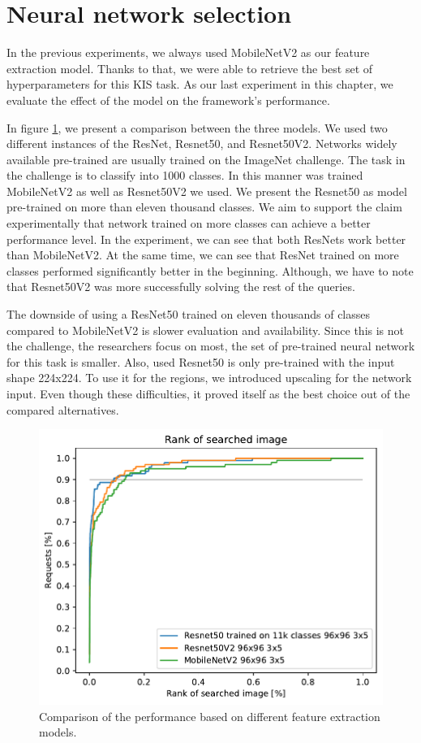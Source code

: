 \section{Neural network selection}

In the previous experiments, we always used MobileNetV2 as our feature extraction model. Thanks to that, we were able to retrieve the best set of hyperparameters for this KIS task. As our last experiment in this chapter, we evaluate the effect of the model on the framework's performance.

In figure \ref{fig:networks}, we present a comparison between the three models. We used two different instances of the ResNet, Resnet50, and Resnet50V2. Networks widely available pre-trained are usually trained on the ImageNet challenge. The task in the challenge is to classify into 1000 classes. In this manner was trained MobileNetV2 as well as Resnet50V2 we used. We present the Resnet50 as model pre-trained on more than eleven thousand classes. We aim to support the claim experimentally that network trained on more classes can achieve a better performance level. In the experiment, we can see that both ResNets work better than MobileNetV2. At the same time, we can see that ResNet trained on more classes performed significantly better in the beginning. Although, we have to note that Resnet50V2 was more successfully solving the rest of the queries.

The downside of using a ResNet50 trained on eleven thousands of classes compared to MobileNetV2 is slower evaluation and availability. Since this is not the challenge, the researchers focus on most, the set of pre-trained neural network for this task is smaller. Also, used Resnet50 is only pre-trained with the input shape 224x224. To use it for the regions, we introduced upscaling for the network input. Even though these difficulties, it proved itself as the best choice out of the compared alternatives.

\begin{figure}
    \centering
    \includegraphics[width=0.8\linewidth]{graphs/2536f6c96149dea24dae84dbf52f760d7d58b0dffa7d660656e1784d9dca277f.pdf}
    \caption{Comparison of the performance based on different feature extraction models.}
    \label{fig:networks}
\end{figure}

